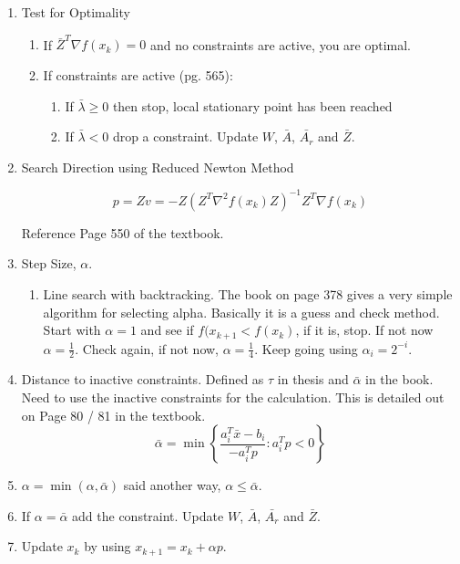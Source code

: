 \documentclass{article}
\begin{document}
\begin{enumerate}
    \item Test for Optimality
    \begin{enumerate}
        \item If $\bar{Z}^{T}\nabla f(x_{k}) = 0$ and no constraints are active, you are optimal.
        \item If constraints are active (pg. 565): 
        \begin{enumerate}
            \item If $\bar{\lambda} \geq 0$ then stop, local stationary point has been reached
            \item If $\bar{\lambda} < 0$ drop a constraint. Update $W$, $\bar{A}$, $\bar{A_{r}}$ and $\bar{Z}$.
        \end{enumerate}
    \end{enumerate}

    \item Search Direction using Reduced Newton Method

    $$p = Zv = -Z(Z^{T}\nabla^2 f(x_k)Z)^{-1}Z^{T}\nabla f(x_{k})$$

    Reference Page 550 of the textbook.
    
    \item Step Size, $\alpha$.
    \begin{enumerate}
        \item Line search with backtracking. The book on page 378 gives a very simple algorithm for selecting alpha. Basically it is a guess and check method. Start with $\alpha = 1$ and see if $f(x_{k+1} < f(x_{k})$, if it is, stop. If not now $\alpha = \frac{1}{2}$. Check again, if not now, $\alpha = \frac{1}{4}$. Keep going using $\alpha_{i} = 2^{-i}$.
    \end{enumerate}
    
    \item Distance to inactive constraints. Defined as $\tau$ in thesis and $\bar{\alpha}$ in the book. Need to use the inactive constraints for the calculation. This is detailed out on Page 80 / 81 in the textbook.
    \begin{equation*}
        \bar{\alpha} = \min \left\{ \dfrac{a_i^T \bar{x} - b_{i}}{-a_i^T p} : a_i^T p < 0 \right \}
    \end{equation*}
    
    \item $\alpha = \min(\alpha, \bar{\alpha})$ said another way, $\alpha \leq \bar{\alpha}$.
    
    \item If $\alpha = \bar{\alpha}$ add the constraint. Update $W$, $\bar{A}$, $\bar{A_{r}}$ and $\bar{Z}$.

    \item Update $x_{k}$ by using $x_{k+1} = x_{k} + \alpha p$.
    
\end{enumerate}
\end{document}

